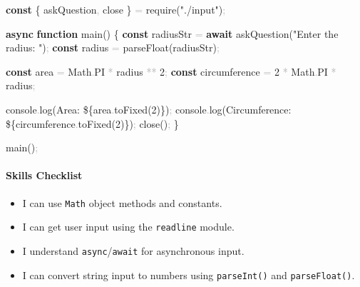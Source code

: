 \documentclass[
  justified,
  openright,
]{tufte-book}
\let\subsection\paragraph
\let\paragraph\paragraph
\newcommand{\KeywordTok}[1]{\textcolor{CodeKeyword}{\textbf{#1}}}  %
\newcommand{\StringTok}[1]{\textcolor{CodeString}{#1}}              %
\newcommand{\CodeNumTok}[1]{\textcolor{CodeNumber}{#1}}             %
\newcommand{\CodeFuncTok}[1]{\textcolor{CodeKeyword}{#1}}           %
\newcommand{\CodeAccentTok}[1]{\textcolor{CodeAccent}{#1}}          %
\newcommand{\OperatorTok}[1]{\textcolor{DarkGray}{#1}}              %
\newenvironment{Shaded}{%
  \begin{mdframed}[style=TufteCode]%
}{%
  \end{mdframed}%
}
\let\subsection\paragraph
\let\paragraph\paragraph
\providecommand{\tightlist}{%
  \setlength{\itemsep}{0pt}\setlength{\parskip}{0pt}}
\begin{document}
\begin{Shaded}
\begin{Highlighting}[]
\KeywordTok{const} \{ askQuestion\OperatorTok{,} close \} \OperatorTok{=} \CodeAccentTok{require}(\StringTok{"./input"})\OperatorTok{;}
 
\KeywordTok{async} \KeywordTok{function} \CodeFuncTok{main}() \{
  \KeywordTok{const} radiusStr \OperatorTok{=} \KeywordTok{await} \CodeFuncTok{askQuestion}(\StringTok{"Enter the radius: "})\OperatorTok{;}
  \KeywordTok{const} radius \OperatorTok{=} \CodeAccentTok{parseFloat}(radiusStr)\OperatorTok{;}
 
  \KeywordTok{const} area \OperatorTok{=} Math\OperatorTok{.}\CodeNumTok{PI} \OperatorTok{*} radius \OperatorTok{**} \CodeNumTok{2}\OperatorTok{;}
  \KeywordTok{const} circumference \OperatorTok{=} \CodeNumTok{2} \OperatorTok{*} Math\OperatorTok{.}\CodeNumTok{PI} \OperatorTok{*} radius\OperatorTok{;}
 
  console\OperatorTok{.}\CodeFuncTok{log}(\StringTok{\textasciigrave{}Area: }\StringTok{\$\{}area\OperatorTok{.}\CodeFuncTok{toFixed}(\CodeNumTok{2})\StringTok{\}}\StringTok{\textasciigrave{}})\OperatorTok{;}
  console\OperatorTok{.}\CodeFuncTok{log}(\StringTok{\textasciigrave{}Circumference: }\StringTok{\$\{}circumference\OperatorTok{.}\CodeFuncTok{toFixed}(\CodeNumTok{2})\StringTok{\}}\StringTok{\textasciigrave{}})\OperatorTok{;}
  \CodeFuncTok{close}()\OperatorTok{;}
\}
 
\CodeFuncTok{main}()\OperatorTok{;}
\end{Highlighting}
\end{Shaded}

\subsection{Skills Checklist}\label{skills-checklist-56}

\begin{itemize}
\tightlist
\item[$\square$]
  I can use \texttt{Math} object methods and constants.
\item[$\square$]
  I can get user input using the \texttt{readline} module.
\item[$\square$]
  I understand \texttt{async}/\texttt{await} for asynchronous input.
\item[$\square$]
  I can convert string input to numbers using \texttt{parseInt()} and
  \texttt{parseFloat()}.
\end{itemize}
\end{document}
